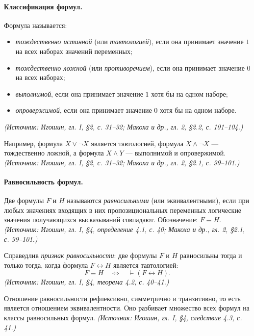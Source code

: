 \documentclass[a4paper,12pt]{article}
\begin{document}
\paragraph{Классификация формул.}
Формула называется:
\begin{itemize}
\item \emph{тождественно истинной} (или \emph{тавтологией}), если она принимает значение \(1\) на всех наборах значений переменных;
\item \emph{тождественно ложной} (или \emph{противоречием}), если она принимает значение \(0\) на всех наборах;
\item \emph{выполнимой}, если она принимает значение \(1\) хотя бы на одном наборе;
\item \emph{опровержимой}, если она принимает значение \(0\) хотя бы на одном наборе.
\end{itemize}
\textit{(Источник: Игошин, гл. I, §2, с. 31--32; Макоха и др., гл. 2, §2.2, с. 101--104.)}

Например, формула \(X\lor\neg X\) является тавтологией, формула \(X\land\neg X\) — тождественно ложной, а формула \(X\land Y\) — выполнимой и опровержимой.
\textit{(Источник: Игошин, гл. I, §2, с. 31--32; Макоха и др., гл. 2, §2.1, с. 99--101.)}

\paragraph{Равносильность формул.}
Две формулы \(F\) и \(H\) называются \emph{равносильными} (или эквивалентными), если при любых значениях входящих в них пропозициональных переменных логические значения получающихся высказываний совпадают. Обозначение: \(F\equiv H\).
\textit{(Источник: Игошин, гл. I, §4, определение 4.1, с. 40; Макоха и др., гл. 2, §2.1, с. 99--101.)}

Справедлив \emph{признак равносильности}: две формулы \(F\) и \(H\) равносильны тогда и только тогда, когда формула \(F\leftrightarrow H\) является тавтологией:
\[
F\equiv H \quad\Longleftrightarrow\quad \models (F\leftrightarrow H).
\]
\textit{(Источник: Игошин, гл. I, §4, теорема 4.2, с. 40--41.)}

Отношение равносильности рефлексивно, симметрично и транзитивно, то есть является отношением эквивалентности. Оно разбивает множество всех формул на классы равносильных формул.
\textit{(Источник: Игошин, гл. I, §4, следствие 4.3, с. 41.)}
\end{document}
